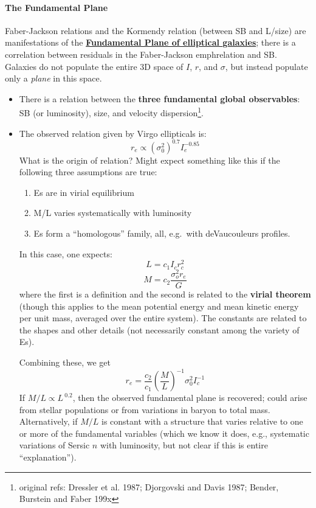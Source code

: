 \documentclass{article}
\begin{document}
\paragraph{The Fundamental Plane}
Faber-Jackson relations and the Kormendy relation (between SB and L/size) are
manifestations of the
\href{http://astronomy.nmsu.edu/holtz/a555/images/djorfig2.htm}
{\textbf{Fundamental Plane of elliptical galaxies}}; there
is a correlation between residuals in the Faber-Jackson emphrelation and SB.
Galaxies do not populate the entire 3D space of $I$, $r$, and $\sigma$, but
instead populate only a \emph{plane} in this space.
\begin{itemize}
    \item There is a relation between the \textbf{three fundamental global
        observables}: SB (or luminosity), size, and velocity
        dispersion\footnote{original refs: Dressler et al. 1987; Djorgovski
        and Davis 1987; Bender, Burstein and Faber 199x}.
    \item The observed relation given by Virgo ellipticals is:
        \[
            r_{e} \propto \left( \sigma_{0}^{2} \right) ^{0.7}I_{e}^{-0.85}
            \]
        What is the origin of relation?
        Might expect something like this if
        the following three assumptions are true:
        \begin{enumerate}
            \item Es are in virial equilibrium
            \item M/L varies systematically with luminosity
            \item Es form a ``homologous'' family, all, e.g.\ with
                deVaucouleurs profiles.
        \end{enumerate}
        In this case, one expects:
        \[
            L = c_{1}I_{c}r_{c}^{2}
            \]
        \[
            M = c_{2}\frac{\sigma^{2}_{o}r_{e}}{G}
            \]
        where the first is a definition and the second is related to the
        \textbf{virial theorem} (though this applies to the mean potential
        energy and mean kinetic energy per unit mass, averaged over the
        entire system). The constants are related to the shapes and other
        details (not necessarily constant among the variety of Es).

        Combining these, we get
        \[
            r_{e} = \frac{c_{2}}{c_{1}}
            \left( \frac{M}{L} \right)^{-1} \sigma_{0}^{2}I_{c}^{-1}
            \]
        If $M/L \propto L^{~0.2}$, then the observed fundamental plane is
        recovered; could arise from stellar populations or from variations
        in baryon to total mass. Alternatively, if $M/L$ is constant with a
        structure that varies relative to one or more of the fundamental
        variables (which we know it does, e.g., systematic variations of
        Sersic $n$ with luminosity, but not clear if this is entire
        ``explanation'').


\end{itemize}
\end{document}
